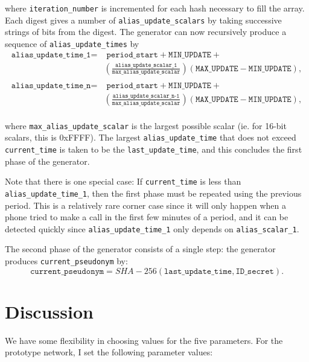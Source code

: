 \documentclass[11pt]{article}
\begin{document}
where \texttt{iteration_number} is incremented for each hash necessary to fill the array. Each digest gives a number of \texttt{alias_update_scalars} by taking successive strings of bits from the digest. The generator can now recursively produce a sequence of \texttt{alias_update_times} by
\begin{equation*}
\begin{split}
\texttt{alias_update_time_1} =  &\;  \texttt{period_start} + \texttt{MIN_UPDATE}  + \\ 
	& (\frac{\texttt{alias_update_scalar_1}}{\texttt{max_alias_update_scalar}}) (\texttt{MAX_UPDATE} - \texttt{MIN_UPDATE}), \\
\end{split}
\end{equation*}
\begin{equation*}
\begin{split}
	\texttt{alias_update_time_n} =  &\;  \texttt{period_start} + \texttt{MIN_UPDATE}  + \\ 
	& (\frac{\texttt{alias_update_scalar_n-1}}{\texttt{max_alias_update_scalar}}) (\texttt{MAX_UPDATE} - \texttt{MIN_UPDATE}), \\
\end{split}
\end{equation*}
	  
where \texttt{max_alias_update_scalar} is the largest possible scalar (ie. for 16-bit scalars, this is 0xFFFF). The largest \texttt{alias_update_time} that does not exceed \texttt{current_time} is taken to be the \texttt{last_update_time}, and this concludes the first phase of the generator.

Note that there is one special case: If \texttt{current_time} is less than \texttt{alias_update_time_1}, then the first phase must be repeated using the previous period. This is a relatively rare corner case since it will only happen when a phone tried to make a call in the first few minutes of a period, and it can be detected quickly since \texttt{alias_update_time_1} only depends on \texttt{alias_scalar_1}.
	    
The second phase of the generator consists of a single step: the generator produces \texttt{current_pseudonym} by:
\begin{equation*}
	\texttt{current_pseudonym} = SHA-256(\texttt{last_update_time}, \texttt{ID_secret}).
\end{equation*}

\section{Discussion}
We have some flexibility in choosing values for the five parameters. For the prototype network, I set the following parameter values:
\end{document}
